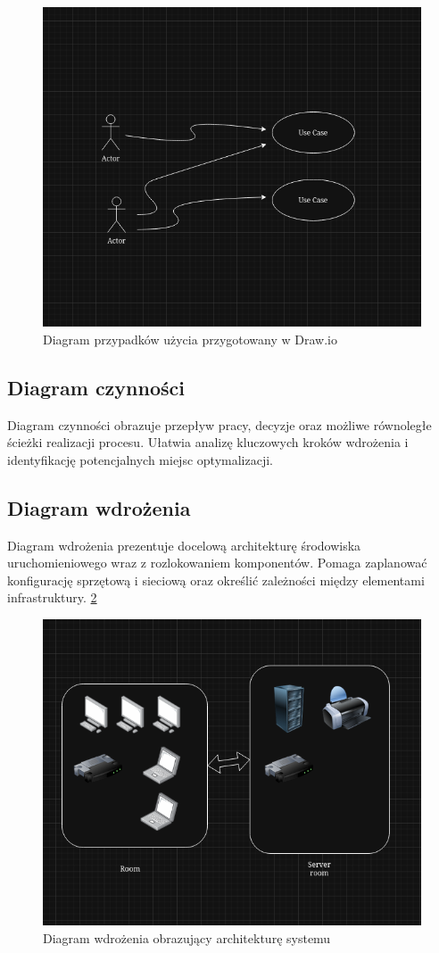 \documentclass[12pt,a4paper]{article}
\begin{document}
\begin{figure}[ht]
    \centering
    \includegraphics[width=0.75\linewidth]{drawio_use_case.png}
    \caption{Diagram przypadków użycia przygotowany w Draw.io}
    \label{fig:drawio_use_case}
\end{figure}

\subsection{Diagram czynności}
Diagram czynności obrazuje przepływ pracy, decyzje oraz możliwe równoległe ścieżki realizacji procesu. Ułatwia analizę kluczowych kroków wdrożenia i identyfikację potencjalnych miejsc optymalizacji.

\subsection{Diagram wdrożenia}
Diagram wdrożenia prezentuje docelową architekturę środowiska uruchomieniowego wraz z rozlokowaniem komponentów. Pomaga zaplanować konfigurację sprzętową i sieciową oraz określić zależności między elementami infrastruktury. \ref{fig:drawio_deployment}

\begin{figure}[h]
    \centering
    \includegraphics[width=0.75\linewidth]{drawio_deployment.png}
    \caption{Diagram wdrożenia obrazujący architekturę systemu}
    \label{fig:drawio_deployment}
\end{figure}
\end{document}
